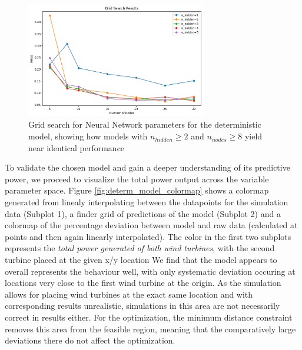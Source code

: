 \begin{figure}[h] 
	\centering
	\includegraphics[width=0.7\textwidth]{figures/optimization/determ_nn_opti.png} 
	\caption{Grid search for Neural Network parameters for the deterministic model, showing how models with $n_{hidden} \geq 2$ and $n_{nodes} \geq 8$ yield near identical performance}
	\label{fig:determ_nn_opti}
\end{figure}

To validate the chosen model and gain a deeper understanding of its predictive power, we proceed to visualize the total power output across the variable parameter space. Figure \ref{fig:determ_model_colormap} shows a colormap generated from linealy interpolating between the datapoints for the simulation data (Subplot 1), a finder grid of predictions of the model (Subplot 2) and a colormap of the percentage deviation between model and raw data (calculated at points and then again linearly interpolated). The color in the first two subplots represents the \textit{total power generated of both wind turbines}, with the second turbine placed at the given x/y location We find that the model appears to overall represents the behaviour well, with only systematic deviation occuring at locations very close to the first wind turbine at the origin. As the simulation allows for placing wind turbines at the exact same location and with corresponding results unrealistic, simulations in this area are not necessarily correct in results either. For the optimization, the minimum distance constraint removes this area from the feasible region, meaning that the comparatively large deviations there do not affect the optimization. 

